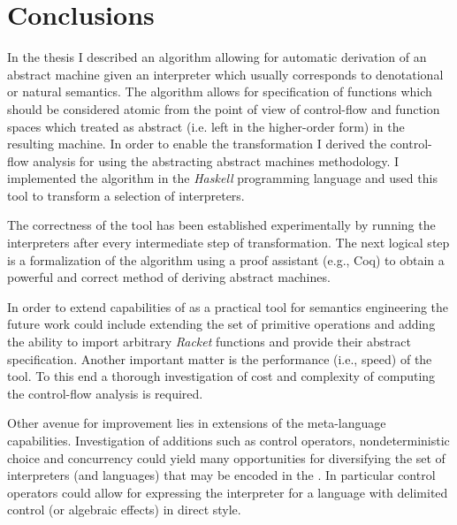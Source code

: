 \chapter{Conclusions}\label{chapter:conclusions}
In the thesis I described an algorithm allowing for automatic derivation of an abstract machine given an interpreter which usually corresponds to denotational or natural semantics.
The algorithm allows for specification of functions which should be considered atomic from the point of view of control-flow and function spaces which treated as abstract (i.e. left in the higher-order form) in the resulting machine.
In order to enable the transformation I derived the control-flow analysis for \IDL{} using the abstracting abstract machines methodology.
I implemented the algorithm in the \textit{Haskell} programming language and used this tool to transform a selection of interpreters.

The correctness of the tool has been established experimentally by running the interpreters after every intermediate step of transformation.
The next logical step is a formalization of the algorithm using a proof assistant (e.g., Coq) to obtain a powerful and correct method of deriving abstract machines.

In order to extend capabilities of \semt{} as a practical tool for semantics engineering the future work could include extending the set of primitive operations and adding the ability to import arbitrary \textit{Racket} functions and provide their abstract specification.
Another important matter is the performance (i.e., speed) of the tool.
To this end a thorough investigation of cost and complexity of computing the control-flow analysis is required.

Other avenue for improvement lies in extensions of the meta-language capabilities.
Investigation of additions such as control operators, nondeterministic choice and concurrency could yield many opportunities for diversifying the set of interpreters (and languages) that may be encoded in the \IDL{}.
In particular control operators could allow for expressing the interpreter for a language with delimited control (or algebraic effects) in direct style.